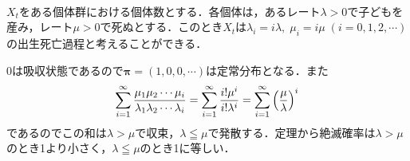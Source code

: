 \documentclass[dvipdfmx]{jsarticle}
\numberwithin{equation}{section}
\theoremstyle{definition}
\newcommand{\bpi}{\bm{\pi}}
\newcommand{\0}{\bm{0}}
\newcommand{\1}{\bm{1}}
\begin{document}
\paragraph{} $X_t$をある個体群における個体数とする．各個体は，あるレート$\lambda > 0$で子どもを産み，レート$\mu > 0$で死ぬとする．このとき$X_t$は$\lambda_i = i \lambda, \; \mu_i = i \mu \; (i = 0,1,2, \cdots)$の出生死亡過程と考えることができる．

0は吸収状態であるので$\bpi = (1,0,0, \cdots)$は定常分布となる．また
\begin{align}
  \sum_{i=1}^{\infty} \frac{\mu_1 \mu_2 \cdots \mu_i}{\lambda_1 \lambda_2 \cdots \lambda_i}
  = \sum_{i=1}^{\infty} \frac{i! \mu^i}{i! \lambda^i} 
  = \sum_{i=1}^{\infty} \qty( \frac{\mu}{\lambda} )^i
\end{align}
であるのでこの和は$\lambda > \mu$で収束，$\lambda \leqq \mu$で発散する．定理から絶滅確率は$\lambda > \mu$のとき1より小さく，$\lambda \leqq \mu$のとき1に等しい．
\end{document}
